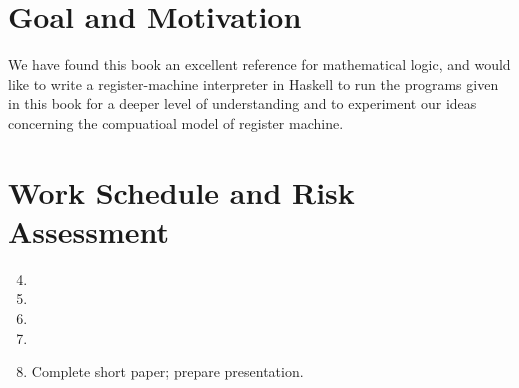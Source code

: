 \documentclass[english]{article}
\begin{document}
\section{Goal and Motivation}
We have found this book an excellent reference for mathematical logic, 
and would like to write a register-machine interpreter in Haskell 
to run the programs given in this book for a deeper level of understanding 
and to experiment our ideas concerning the compuatioal model of register machine.
%
%
\section{Work Schedule and Risk Assessment}
\begin{enumerate}[Week 1.]
\setcounter{enumi}{3}
\item 
\item 
\item 
\item 
\item Complete short paper; prepare presentation.
\end{enumerate}
\end{document}

